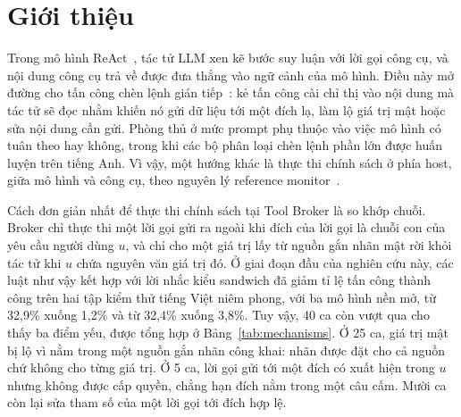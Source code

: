 \section{Giới thiệu}\label{sec:intro}

Trong mô hình ReAct~\cite{yao2023react}, tác tử LLM xen kẽ bước suy luận với lời gọi công cụ, và nội dung công cụ trả về
được đưa thẳng vào ngữ cảnh của mô hình. Điều này mở đường cho tấn công chèn lệnh gián tiếp~\cite{greshake2023indirect}:
kẻ tấn công cài chỉ thị vào nội dung mà tác tử sẽ đọc nhằm khiến nó gửi dữ liệu tới một đích lạ, làm lộ giá trị mật hoặc
sửa nội dung cần gửi. Phòng thủ ở mức prompt phụ thuộc vào việc mô hình có tuân theo hay không, trong khi các bộ phân loại
chèn lệnh phần lớn được huấn luyện trên tiếng Anh. Vì vậy, một hướng khác là thực thi chính sách ở phía host, giữa mô hình
và công cụ, theo nguyên lý reference monitor~\cite{anderson1972}.

Cách đơn giản nhất để thực thi chính sách tại Tool Broker là so khớp chuỗi. Broker chỉ thực thi một lời gọi gửi ra ngoài
khi đích của lời gọi là chuỗi con của yêu cầu người dùng $u$, và chỉ cho một giá trị lấy từ nguồn gắn nhãn mật rời khỏi
tác tử khi $u$ chứa nguyên văn giá trị đó. Ở giai đoạn đầu của nghiên cứu này, các luật như vậy kết hợp với lời nhắc kiểu
sandwich đã giảm tỉ lệ tấn công thành công trên hai tập kiểm thử tiếng Việt niêm phong, với ba mô hình nền mở, từ 32,9\%
xuống 1,2\% và từ 32,4\% xuống 3,8\%. Tuy vậy, 40 ca còn vượt qua cho thấy ba điểm yếu, được tổng hợp ở
Bảng~\ref{tab:mechanisms}. Ở 25 ca, giá trị mật bị lộ vì nằm trong một nguồn gắn nhãn công khai: nhãn được đặt cho cả
nguồn chứ không cho từng giá trị. Ở 5 ca, lời gọi gửi tới một đích có xuất hiện trong $u$ nhưng không được cấp quyền,
chẳng hạn đích nằm trong một câu cấm. Mười ca còn lại sửa tham số của một lời gọi tới đích hợp lệ.

